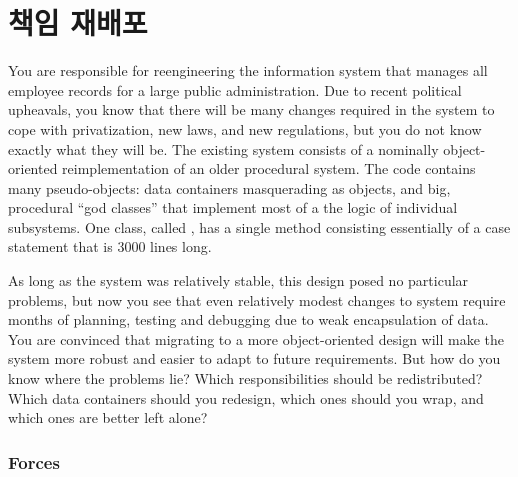 \documentclass[a4paper,10pt,twoside]{book}
\begin{document}
	\renewcommand{\nnbb}[2]{} %
	\sloppy
\fi
\chapter{책임 재배포}

You are responsible for reengineering the information system that manages all employee records for a large public administration. Due to recent political upheavals, you know that there will be many changes required in the system to cope with privatization, new laws, and new regulations, but you do not know exactly what they will be. The existing system consists of a nominally object-oriented reimplementation of an older procedural system. The code contains many pseudo-objects: data containers masquerading as objects, and big, procedural ``god classes'' that implement most of a the logic of individual subsystems. One class, called , has a single method consisting essentially of a case statement that is 3000 lines long.

As long as the system was relatively stable, this design posed no particular problems, but now you see that even relatively modest changes to system require months of planning, testing and debugging due to weak encapsulation of data. You are convinced that migrating to a more object-oriented design will make the system more robust and easier to adapt to future requirements. But how do you know where the problems lie? Which responsibilities should be redistributed? Which data containers should you redesign, which ones should you wrap, and which ones are better left alone?

\subsection*{Forces}
\end{document}
